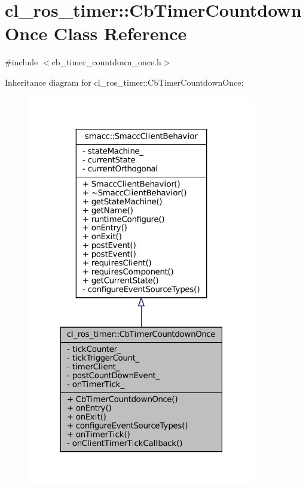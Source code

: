 \hypertarget{classcl__ros__timer_1_1CbTimerCountdownOnce}{}\section{cl\+\_\+ros\+\_\+timer\+:\+:Cb\+Timer\+Countdown\+Once Class Reference}
\label{classcl__ros__timer_1_1CbTimerCountdownOnce}


{\ttfamily \#include $<$cb\+\_\+timer\+\_\+countdown\+\_\+once.\+h$>$}



Inheritance diagram for cl\+\_\+ros\+\_\+timer\+:\+:Cb\+Timer\+Countdown\+Once\+:
\nopagebreak
\begin{figure}[H]
\begin{center}
\leavevmode
\includegraphics[width=283pt]{classcl__ros__timer_1_1CbTimerCountdownOnce__inherit__graph}
\end{center}
\end{figure}


